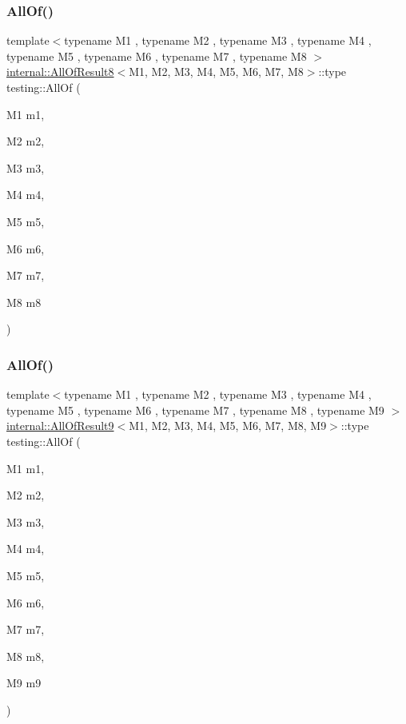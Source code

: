\mbox{\label{namespacetesting_a7ec0bc4eca9805e85b9b34bbbf3d3ae2}} 
\subsubsection{\texorpdfstring{All\+Of()}{AllOf()}\hspace{0.1cm}{\footnotesize\ttfamily [7/9]}}
{\footnotesize\ttfamily template$<$typename M1 , typename M2 , typename M3 , typename M4 , typename M5 , typename M6 , typename M7 , typename M8 $>$ \\
\hyperlink{structtesting_1_1internal_1_1_all_of_result8}{internal\+::\+All\+Of\+Result8}$<$M1, M2, M3, M4, M5, M6, M7, M8$>$\+::type testing\+::\+All\+Of (\begin{DoxyParamCaption}\item[{M1}]{m1,  }\item[{M2}]{m2,  }\item[{M3}]{m3,  }\item[{M4}]{m4,  }\item[{M5}]{m5,  }\item[{M6}]{m6,  }\item[{M7}]{m7,  }\item[{M8}]{m8 }\end{DoxyParamCaption})\hspace{0.3cm}{\ttfamily [inline]}}

\mbox{\label{namespacetesting_aaecf2bd8eb7c68b119f9b81a01942b7f}} 
\subsubsection{\texorpdfstring{All\+Of()}{AllOf()}\hspace{0.1cm}{\footnotesize\ttfamily [8/9]}}
{\footnotesize\ttfamily template$<$typename M1 , typename M2 , typename M3 , typename M4 , typename M5 , typename M6 , typename M7 , typename M8 , typename M9 $>$ \\
\hyperlink{structtesting_1_1internal_1_1_all_of_result9}{internal\+::\+All\+Of\+Result9}$<$M1, M2, M3, M4, M5, M6, M7, M8, M9$>$\+::type testing\+::\+All\+Of (\begin{DoxyParamCaption}\item[{M1}]{m1,  }\item[{M2}]{m2,  }\item[{M3}]{m3,  }\item[{M4}]{m4,  }\item[{M5}]{m5,  }\item[{M6}]{m6,  }\item[{M7}]{m7,  }\item[{M8}]{m8,  }\item[{M9}]{m9 }\end{DoxyParamCaption})\hspace{0.3cm}{\ttfamily [inline]}}

